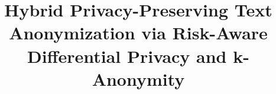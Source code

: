 \documentclass[10pt, a4paper]{article}
\title{Hybrid Privacy-Preserving Text Anonymization via Risk-Aware Differential Privacy and k-Anonymity}
\begin{document}
\maketitleabstract






\end{document}
